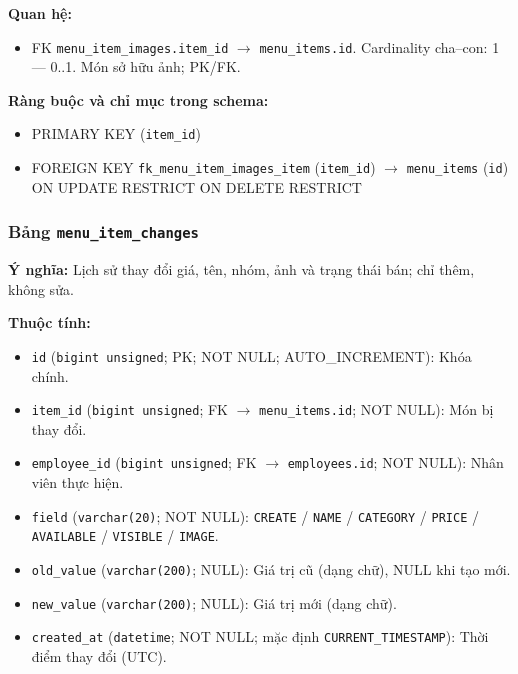 \textbf{Quan hệ:}

\begin{itemize}

\item FK \texttt{menu\_item\_images.item\_id} $\rightarrow$ \texttt{menu\_items.id}. Cardinality cha--con: 1 — 0..1. Món sở hữu ảnh; PK/FK.

\end{itemize}

\textbf{Ràng buộc và chỉ mục trong schema:}

\begin{itemize}

\item PRIMARY KEY (\texttt{item\_id})

\item FOREIGN KEY \texttt{fk\_menu\_item\_images\_item} (\texttt{item\_id}) $\rightarrow$ \texttt{menu\_items} (\texttt{id}) ON UPDATE RESTRICT ON DELETE RESTRICT

\end{itemize}

\subsubsection{Bảng \texttt{menu\_item\_changes}}

\textbf{Ý nghĩa:} Lịch sử thay đổi giá, tên, nhóm, ảnh và trạng thái bán; chỉ thêm, không sửa.\par

\textbf{Thuộc tính:}

\begin{itemize}

\item \texttt{id} (\texttt{bigint unsigned}; PK; NOT NULL; AUTO_INCREMENT): Khóa chính.

\item \texttt{item\_id} (\texttt{bigint unsigned}; FK $\rightarrow$ \texttt{menu\_items.id}; NOT NULL): Món bị thay đổi.

\item \texttt{employee\_id} (\texttt{bigint unsigned}; FK $\rightarrow$ \texttt{employees.id}; NOT NULL): Nhân viên thực hiện.

\item \texttt{field} (\texttt{varchar(20)}; NOT NULL): \texttt{CREATE} / \texttt{NAME} / \texttt{CATEGORY} / \texttt{PRICE} / \texttt{AVAILABLE} / \texttt{VISIBLE} / \texttt{IMAGE}.

\item \texttt{old\_value} (\texttt{varchar(200)}; NULL): Giá trị cũ (dạng chữ), NULL khi tạo mới.

\item \texttt{new\_value} (\texttt{varchar(200)}; NULL): Giá trị mới (dạng chữ).

\item \texttt{created\_at} (\texttt{datetime}; NOT NULL; mặc định \texttt{CURRENT\_TIMESTAMP}): Thời điểm thay đổi (UTC).

\end{itemize}

